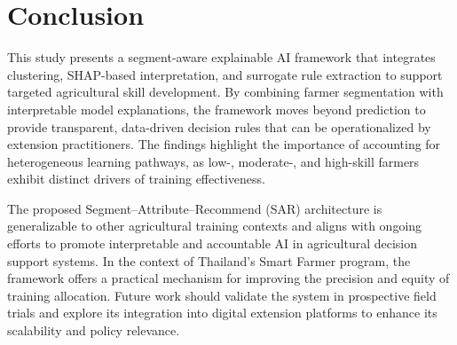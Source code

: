 \section{Conclusion}

This study presents a segment-aware explainable AI framework that integrates clustering, SHAP-based interpretation, and surrogate rule extraction to support targeted agricultural skill development. By combining farmer segmentation with interpretable model explanations, the framework moves beyond prediction to provide transparent, data-driven decision rules that can be operationalized by extension practitioners. The findings highlight the importance of accounting for heterogeneous learning pathways, as low-, moderate-, and high-skill farmers exhibit distinct drivers of training effectiveness.

The proposed Segment–Attribute–Recommend (SAR) architecture is generalizable to other agricultural training contexts and aligns with ongoing efforts to promote interpretable and accountable AI in agricultural decision support systems. In the context of Thailand’s Smart Farmer program, the framework offers a practical mechanism for improving the precision and equity of training allocation. Future work should validate the system in prospective field trials and explore its integration into digital extension platforms to enhance its scalability and policy relevance.
